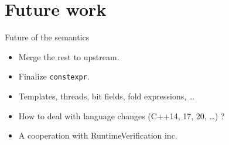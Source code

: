\documentclass[11pt]{beamer}
\begin{document}
\section{Future work}

\begin{frame}{Future of the semantics}
\begin{itemize}
\pause \item Merge the rest to upstream.
\pause \item Finalize \texttt{constexpr}.
\pause \item Templates, threads, bit fields, fold expressions, \ldots
\pause \item How to deal with language changes (C++14, 17, 20, \ldots) ?
\pause \item A cooperation with RuntimeVerification inc.
\end{itemize}
\end{frame}




%
\end{document}
